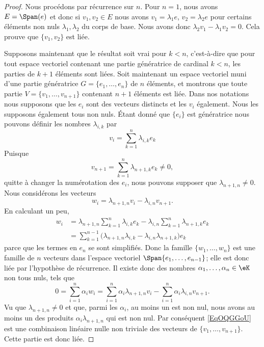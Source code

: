 \begin{proof}
	Nous procédons par récurrence sur \( n\). Pour \( n=1\), nous avons \( E=\Span(e)\) et donc si \( v_1,v_2\in E\) nous avons \( v_1=\lambda_1 e\), \( v_2=\lambda_2e\) pour certains éléments non nuls \( \lambda_1,\lambda_2\) du corps de base. Nous avons donc \( \lambda_2v_1-\lambda_1v_2=0\). Cela prouve que \( \{ v_1,v_2 \}\) est liée.

	Supposons maintenant que le résultat soit vrai pour \( k<n\), c'est-à-dire que pour tout espace vectoriel contenant une partie génératrice de cardinal \( k<n\), les parties de \( k+1\) éléments sont liées. Soit maintenant un espace vectoriel muni d'une partie génératrice \( G=\{ e_1,\ldots, e_n \}\) de \( n\) éléments, et montrons que toute partie \( V=\{ v_1,\ldots, v_{n+1} \}\) contenant \( n+1\) éléments est liée. Dans nos notations nous supposons que les \( e_i\) sont des vecteurs distincts et les \( v_i\) également. Nous les supposons également tous non nuls. Étant donné que \( \{ e_i \}\) est génératrice nous pouvons définir les nombres \( \lambda_{i,k}\) par
	\begin{equation}
		v_i=\sum_{k=1}^n\lambda_{i,k}e_k
	\end{equation}
	Puisque
	\begin{equation}
		v_{n+1}=\sum_{k=1}^n\lambda_{n+1,k}e_k\neq 0,
	\end{equation}
	quitte à changer la numérotation des \( e_i\), nous pouvons supposer que \( \lambda_{n+1,n}\neq 0\). Nous considérons les vecteurs
	\begin{equation}
		w_i=\lambda_{n+1,n}v_i-\lambda_{i,n}v_{n+1}.
	\end{equation}
	En calculant un peu,
	\begin{subequations}
		\begin{align}
			w_i & =\lambda_{n+1,n}\sum_{k=1}^n\lambda_{i,k}e_k-\lambda_{i,n}\sum_{k=1}^n\lambda_{n+1,k}e_k  \\
			    & =\sum_{k=1}^{n-1}\big( \lambda_{n+1,n}\lambda_{i,k}-\lambda_{i,n}\lambda_{n+1,k} \big)e_k
		\end{align}
	\end{subequations}
	parce que les termes en \( e_n\) se sont simplifiés. Donc la famille \( \{ w_1,\ldots, w_n \}\) est une famille de \( n\) vecteurs dans l'espace vectoriel \( \Span\{ e_1,\ldots, e_{n-1} \}\); elle est donc liée par l'hypothèse de récurrence. Il existe donc des nombres \( \alpha_1,\ldots, \alpha_n\in \eK\) non tous nuls, tels que
	\begin{equation}        \label{EqOQGGoU}
		0=\sum_{i=1}^n\alpha_iw_i=\sum_{i=1}^n\alpha_i\lambda_{n+1,n}v_i - \sum_{i=1}^n\alpha_i\lambda_{i,n} v_{n+1}.
	\end{equation}
	Vu que \( \lambda_{n+1,n}\neq 0\) et que, parmi les \( \alpha_i\), au moins un est non nul, nous avons au moins un des produits \( \alpha_i\lambda_{n+1,n}\) qui est non nul. Par conséquent \eqref{EqOQGGoU} est une combinaison linéaire nulle non triviale des vecteurs de \( \{ v_1,\ldots, v_{n+1} \}\). Cette partie est donc liée.
\end{proof}

